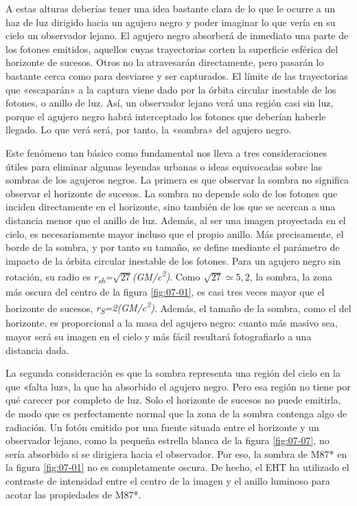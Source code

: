 A estas alturas deberías tener una idea bastante clara de lo que le ocurre a un haz de luz dirigido hacia un agujero negro y poder imaginar lo que vería en su cielo un observador lejano. El agujero negro absorberá de inmediato una parte de los fotones emitidos, aquellos cuyas trayectorias corten la superficie esférica del horizonte de sucesos. Otros no la atravesarán directamente, pero pasarán lo bastante cerca como para desviarse y ser capturados. El límite de las trayectorias que «escaparán» a la captura viene dado por la órbita circular inestable de los fotones, o anillo de luz. Así, un observador lejano verá una región casi sin luz, porque el agujero negro habrá interceptado los fotones que deberían haberle llegado. Lo que verá será, por tanto, la «sombra» del agujero negro.

Este fenómeno tan básico como fundamental nos lleva a tres consideraciones útiles para eliminar algunas leyendas urbanas o ideas equivocadas sobre las sombras de los agujeros negros. La primera es que observar la sombra no significa observar el horizonte de sucesos. La sombra no depende solo de los fotones que inciden directamente en el horizonte, sino también de los que se acercan a una distancia menor que el anillo de luz. Además, al ser una imagen proyectada en el cielo, es necesariamente mayor incluso que el propio anillo. Más precisamente, el borde de la sombra, y por tanto su tamaño, se define mediante el parámetro de impacto de la órbita circular inestable de los fotones. Para un agujero negro sin rotación, su radio es \emph{r\textsubscript{sh}=}\(\sqrt{27}\)\emph{(GM/c\textsuperscript{2})}. Como \(\sqrt{27} \simeq 5{,}2\), la sombra, la zona más oscura del centro de la figura \ref{fig:07-01}, es casi tres veces mayor que el horizonte de sucesos, \emph{r\textsubscript{S}=2(GM/c\textsuperscript{2})}. Además, el tamaño de la sombra, como el del horizonte, es proporcional a la masa del agujero negro: cuanto más masivo sea, mayor será su imagen en el cielo y más fácil resultará fotografiarlo a una distancia dada.

La segunda consideración es que la sombra representa una región del cielo en la que «falta luz», la que ha absorbido el agujero negro. Pero esa región no tiene por qué carecer por completo de luz. Solo el horizonte de sucesos no puede emitirla, de modo que es perfectamente normal que la zona de la sombra contenga algo de radiación. Un fotón emitido por una fuente situada entre el horizonte y un observador lejano, como la pequeña estrella blanca de la figura \ref{fig:07-07}, no sería absorbido si se dirigiera hacia el observador. Por eso, la sombra de M87* en la figura \ref{fig:07-01} no es completamente oscura. De hecho, el EHT ha utilizado el contraste de intensidad entre el centro de la imagen y el anillo luminoso para acotar las propiedades de M87*.

